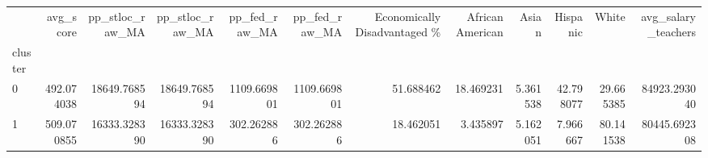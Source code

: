 \begin{tabular}{lrrrrrrrrrrr}
\toprule
{} &   avg\_score &  pp\_stloc\_raw\_MA &  pp\_stloc\_raw\_MA &  pp\_fed\_raw\_MA &  pp\_fed\_raw\_MA &  Economically Disadvantaged \% &  African American &     Asian &   Hispanic &      White &  avg\_salary\_teachers \\
cluster &             &                  &                  &                &                &                               &                   &           &            &            &                      \\
\midrule
0       &  492.074038 &     18649.768594 &     18649.768594 &    1109.669801 &    1109.669801 &                     51.688462 &         18.469231 &  5.361538 &  42.798077 &  29.665385 &         84923.293040 \\
1       &  509.070855 &     16333.328390 &     16333.328390 &     302.262886 &     302.262886 &                     18.462051 &          3.435897 &  5.162051 &   7.966667 &  80.141538 &         80445.692308 \\
\bottomrule
\end{tabular}

